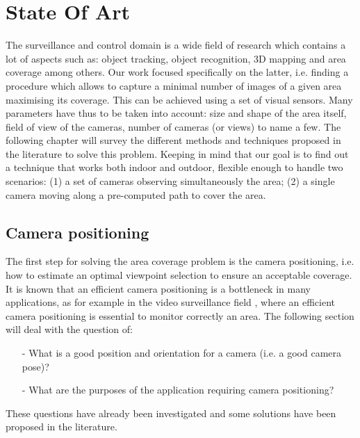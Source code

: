 \chapter{State Of Art}\label{chap:stateOfTheArt}

\minitoc

The surveillance and control domain is a wide field of research which contains a lot of aspects such as: object tracking, object recognition, 3D mapping and area coverage among others. Our work focused specifically on the latter, i.e. finding a procedure which allows to capture a minimal number of images of a given area maximising its coverage.    
This can be achieved using a set of visual sensors. Many parameters have thus to be taken into account: size and shape of the area itself, field of view of the cameras, number of cameras (or views) to name a few. The following chapter will survey the different methods and techniques proposed in the literature to solve this problem. Keeping in mind that our goal is to find out a technique that works both indoor and outdoor, flexible enough to handle two scenarios: (1) a set of cameras observing simultaneously the area; (2) a single camera moving along a pre-computed path to cover the area. 

\section{Camera positioning }\label{sec:camerasPositioning}

The first step for solving the area coverage problem is the camera positioning, i.e. how to estimate an optimal viewpoint selection to ensure an acceptable coverage. It is known that an efficient camera positioning is a bottleneck in many applications, as for example in the video surveillance field \cite{11*herrera2012,12*soto2009,18*ding2012,151*zhao2013,84*xu2011}, where an efficient camera positioning is essential to monitor correctly an area.  
The following section will deal with the question of: 
\begin{itemize}
\item[-]What is a good position and orientation for a camera (i.e. a good camera pose)?
\item[-]What are the purposes of the application requiring camera positioning?

\end{itemize}
These questions have already been investigated and some solutions have been proposed in the literature. 


